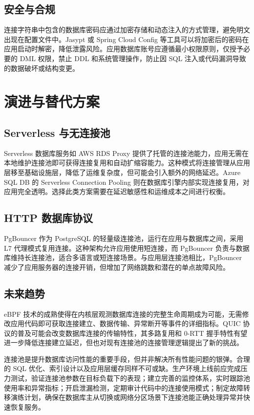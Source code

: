 \section{安全与合规}
连接字符串中包含的数据库密码应通过加密存储和动态注入的方式管理，避免明文出现在配置文件中。Jasypt 或 Spring Cloud Config 等工具可以将加密后的密码在应用启动时解密，降低泄露风险。应用数据库账号应遵循最小权限原则，仅授予必要的 DML 权限，禁止 DDL 和系统管理操作，防止因 SQL 注入或代码漏洞导致的数据破坏或结构变更。\par
\chapter{演进与替代方案}
\section{Serverless 与无连接池}
Serverless 数据库服务如 AWS RDS Proxy 提供了托管的连接池能力，应用无需在本地维护连接池即可获得连接复用和自动扩缩容能力。这种模式将连接管理从应用层移至基础设施层，降低了运维复杂度，但可能会引入额外的网络延迟。Azure SQL DB 的 Serverless Connection Pooling 则在数据库引擎内部实现连接复用，对应用完全透明。选择此类方案需要在延迟敏感性和运维成本之间进行权衡。\par
\section{HTTP 数据库协议}
PgBouncer 作为 PostgreSQL 的轻量级连接池，运行在应用与数据库之间，采用 L7 代理模式复用连接。这种架构允许应用使用短连接，而 PgBouncer 负责与数据库维持长连接池，适合多语言或短连接场景。与应用层连接池相比，PgBouncer 减少了应用服务器的连接开销，但增加了网络跳数和潜在的单点故障风险。\par
\section{未来趋势}
eBPF 技术的成熟使得在内核层观测数据库连接的完整生命周期成为可能，无需修改应用代码即可获取连接建立、数据传输、异常断开等事件的详细指标。QUIC 协议的普及可能会改变数据库连接的传输特性，其多路复用和 0-RTT 握手特性有望进一步降低连接建立延迟，但也对现有连接池的连接管理逻辑提出了新的挑战。\par
连接池是提升数据库访问性能的重要手段，但并非解决所有性能问题的银弹。合理的 SQL 优化、索引设计以及应用层缓存同样不可或缺。生产环境上线前应完成压力测试，验证连接池参数在目标负载下的表现；建立完善的监控体系，实时跟踪池使用率和异常指标；开启泄漏检测，定期审计代码中的连接使用模式；制定故障转移演练计划，确保在数据库主从切换或网络分区场景下连接池能正确处理异常并快速恢复服务。\par
